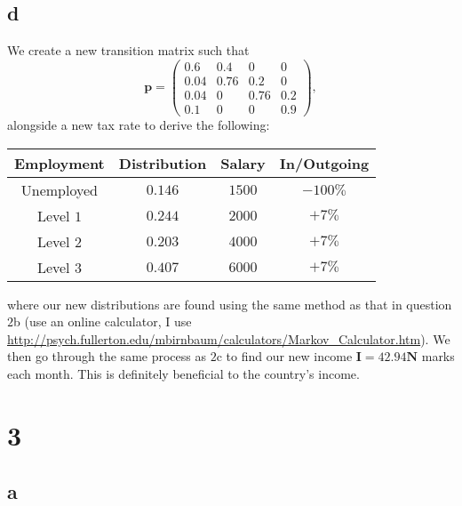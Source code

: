\documentclass{article}
\begin{document}
\subsection{d}
We create a new transition matrix such that
\begin{equation}
    \mathbf{p} = \begin{pmatrix}
        0.6 & 0.4 & 0 & 0 \\
        0.04 & 0.76 & 0.2 & 0 \\
        0.04 & 0 & 0.76 & 0.2 \\
        0.1 & 0 & 0 & 0.9 
    \end{pmatrix},
\end{equation}
alongside a new tax rate to derive the following:
\begin{table}[H]
    \centering
    \begin{tabular}{|c|c|c|c|}
    \hline
        Employment & Distribution & Salary & In/Outgoing \\
        \hline
        Unemployed & $0.146$ & $1500$ & $-100\%$ \\
        Level $1$ & $0.244$ & $2000$ & $+7\%$ \\
        Level $2$ & $0.203$ & $4000$ & $+7\%$ \\
        Level $3$ & $0.407$ & $6000$ & $+7\%$ \\
        \hline
    \end{tabular}
    \label{2d}
\end{table}
where our new distributions are found using the same method as that in question $2$b (use an online calculator, I use \url{http://psych.fullerton.edu/mbirnbaum/calculators/Markov_Calculator.htm}). We then go through the same process as $2$c to find our new income $\mathbf{I} = 42.94\mathbf{N}$ marks each month. This is definitely beneficial to the country's income.

\section{3}
\subsection{a}
\end{document}
